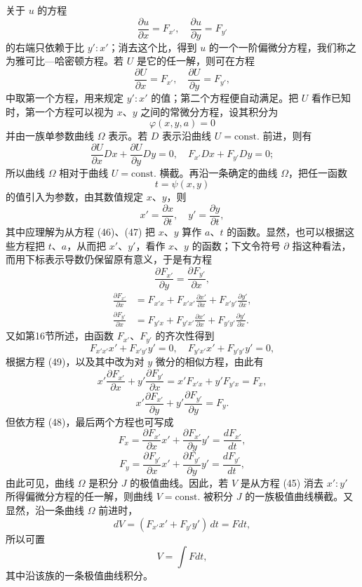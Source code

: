 \documentclass[11pt,a4paper,leqno]{article}
\begin{document}
关于 $u$ 的方程
\[
\frac{\partial u}{\partial x}=F_{x'},\quad
\frac{\partial u}{\partial y}=F_{y'}
\]
的右端只依赖于比 $y':x'$；消去这个比，得到 $u$ 的一个一阶偏微分方程，我们称之为雅可比—哈密顿方程。若 $U$ 是它的任一解，则可在方程
\begin{equation}\tag{45}
\frac{\partial U}{\partial x}=F_{x'},\quad
\frac{\partial U}{\partial y}=F_{y'},
\end{equation}
中取第一个方程，用来规定 $y':x'$ 的值；第二个方程便自动满足。把 $U$ 看作已知时，第一个方程可以视为 $x$、$y$ 之间的常微分方程，设其积分为
\begin{equation}\tag{46}
\varphi(x,y,a)=0
\end{equation}
并由一族单参数曲线 $\Omega$ 表示。若 $D$ 表示沿曲线 $U=\text{const.}$ 前进，则有
\[
\frac{\partial U}{\partial x}Dx+\frac{\partial U}{\partial y}Dy=0,\quad
F_{x'}Dx+F_{y'}Dy=0;
\]
所以曲线 $\Omega$ 相对于曲线 $U=\text{const.}$ 横截。再沿一条确定的曲线 $\Omega$，把任一函数
\begin{equation}\tag{47}
t=\psi(x,y)
\end{equation}
的值引入为参数，由其数值规定 $x$、$y$，则
\[
x'=\frac{\partial x}{\partial t},\quad y'=\frac{\partial y}{\partial t},
\]
其中应理解为从方程 (46)、(47) 把 $x$、$y$ 算作 $a$、$t$ 的函数。显然，也可以根据这些方程把 $t$、$a$，从而把 $x'$、$y'$，看作 $x$、$y$ 的函数；下文令符号 $\partial$ 指这种看法，而用下标表示导数仍保留原有意义，于是有方程
\begin{equation}\tag{48}
\frac{\partial F_{x'}}{\partial y}=\frac{\partial F_{y'}}{\partial x},
\end{equation}
\begin{equation}\tag{49}
\begin{aligned}
\frac{\partial F_{x'}}{\partial x}
&=
F_{x'x}+F_{x'x'}\frac{\partial x'}{\partial x}
+F_{x'y'}\frac{\partial y'}{\partial x},\\
\frac{\partial F_{y'}}{\partial x}
&=
F_{y'x}+F_{y'x'}\frac{\partial x'}{\partial x}
+F_{y'y'}\frac{\partial y'}{\partial x}.
\end{aligned}
\end{equation}
又如第16节所述，由函数 $F_{x'}$、$F_{y'}$ 的齐次性得到
\begin{equation}\tag{50}
F_{x'x'}x'+F_{x'y'}y'=0,\quad
F_{y'x'}x'+F_{y'y'}y'=0,
\end{equation}
根据方程 (49)，以及其中改为对 $y$ 微分的相似方程，由此有
\[
x'\frac{\partial F_{x'}}{\partial x}
+y'\frac{\partial F_{y'}}{\partial x}
=
x'F_{x'x}+y'F_{y'x}=F_x,
\]
\[
x'\frac{\partial F_{x'}}{\partial y}
+y'\frac{\partial F_{y'}}{\partial y}=F_y.
\]
但依方程 (48)，最后两个方程也可写成
\[
F_x=
\frac{\partial F_{x'}}{\partial x}x'
+\frac{\partial F_{x'}}{\partial y}y'
=\frac{dF_{x'}}{dt},
\]
\[
F_y=
\frac{\partial F_{y'}}{\partial x}x'
+\frac{\partial F_{y'}}{\partial y}y'
=\frac{dF_{y'}}{dt},
\]
由此可见，曲线 $\Omega$ 是积分 $J$ 的极值曲线。因此，若 $V$ 是从方程 (45) 消去 $x':y'$ 所得偏微分方程的任一解，则曲线 $V=\text{const.}$ 被积分 $J$ 的一族极值曲线横截。又显然，沿一条曲线 $\Omega$ 前进时，
\[
dV=(F_{x'}x'+F_{y'}y')\,dt=Fdt,
\]
所以可置
\[
V=\int Fdt,
\]
其中沿该族的一条极值曲线积分。
\end{document}
